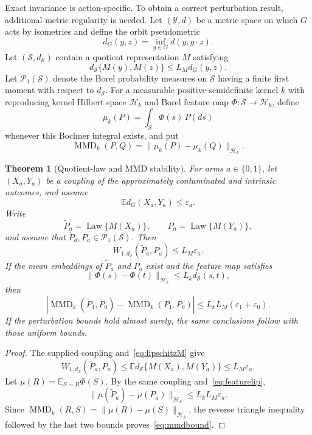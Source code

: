 \documentclass[11pt]{article}
\theoremstyle{plain}
\newtheorem{theorem}{Theorem}[section]
\theoremstyle{definition}
\numberwithin{equation}{section}
\DeclareMathOperator{\Law}{Law}
\DeclareMathOperator{\MMD}{MMD}
\newcommand{\E}{\mathbb E}
\newcommand{\1}{\mathbf 1}
\newcommand{\calH}{\mathcal H}
\newcommand{\calS}{\mathcal S}
\newcommand{\calY}{\mathcal Y}
\begin{document}
Exact invariance is action-specific. To obtain a correct perturbation result, additional metric regularity is needed. Let $(\calY,d)$ be a metric space on which $G$ acts by isometries and define the orbit pseudometric
\begin{equation}\label{eq:orbitmetric}
d_G(y,z)=\inf_{g\in G}d(y,g\cdot z).
\end{equation}
Let $(\calS,d_{\calS})$ contain a quotient representation $M$ satisfying
\begin{equation}\label{eq:lipschitzM}
d_{\calS}\{M(y),M(z)\}\le L_M d_G(y,z).
\end{equation}
Let $\mathcal P_1(\calS)$ denote the Borel probability measures on
$\calS$ having a finite first moment with respect to $d_{\calS}$.
For a measurable positive-semidefinite kernel $k$ with reproducing
kernel Hilbert space $\calH_k$ and Borel feature map
$\Phi:\calS\to\calH_k$, define
\[
\mu_k(P)=\int_{\calS}\Phi(s)\,P(ds)
\]
whenever this Bochner integral exists, and put
\[
\MMD_k(P,Q)
=
\|\mu_k(P)-\mu_k(Q)\|_{\calH_k}.
\]
\begin{theorem}[Quotient-law and MMD stability]\label{thm:stability}
For arms $a\in\{0,1\}$, let $(X_a,Y_a)$ be a coupling of the approximately contaminated and intrinsic outcomes, and assume
\[
\E d_G(X_a,Y_a)\le\varepsilon_a.
\]
Write
\[
\widetilde P_a=\Law\{M(X_a)\},
\qquad
P_a=\Law\{M(Y_a)\},
\]
and assume that $\widetilde P_a,P_a\in\mathcal P_1(\calS)$. Then
\begin{equation}\label{eq:w1bound}
W_{1,d_{\calS}}(\widetilde P_a,P_a)\le L_M\varepsilon_a.
\end{equation}
If the mean embeddings of $\widetilde P_a$ and $P_a$ exist and the
feature map satisfies
\begin{equation}\label{eq:featurelip}
\|\Phi(s)-\Phi(t)\|_{\calH_k}\le L_k d_{\calS}(s,t),
\end{equation}
then
\begin{equation}\label{eq:mmdbound}
\left|\MMD_k(\widetilde P_1,\widetilde P_0)-\MMD_k(P_1,P_0)\right|
\le L_kL_M(\varepsilon_1+\varepsilon_0).
\end{equation}
If the perturbation bounds hold almost surely, the same conclusions follow with those uniform bounds.
\end{theorem}

\begin{proof}
The supplied coupling and~\eqref{eq:lipschitzM} give
\[
W_{1,d_{\calS}}(\widetilde P_a,P_a)
\le\E d_{\calS}\{M(X_a),M(Y_a)\}
\le L_M\varepsilon_a.
\]
Let $\mu(R)=\E_{S\sim R}\Phi(S)$. By the same coupling and~\eqref{eq:featurelip},
\[
\|\mu(\widetilde P_a)-\mu(P_a)\|_{\calH_k}\le L_kL_M\varepsilon_a.
\]
Since $\MMD_k(R,S)=\|\mu(R)-\mu(S)\|_{\calH_k}$, the reverse triangle inequality followed by the last two bounds proves~\eqref{eq:mmdbound}.
\end{proof}
\end{document}
